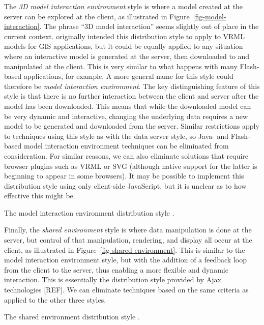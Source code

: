 \documentclass[acmtocl,acmnow]{acmtrans2m}
\begin{document}
The \emph{3D model interaction environment} style is where a model
created at the server can be explored at the client, as illustrated in
Figure~\ref{fig-model-interaction}. The phrase ``3D model interaction''
seems slightly out of place in the current context.
 originally intended this distribution style to
apply to VRML models for GIS applications, but it could be equally
applied to any situation where an interactive model is generated at the
server, then downloaded to and manipulated at the client. This is very
similar to what happens with many Flash-based applications, for example.
A more general name for this style could therefore be \emph{model
interaction environment}. The key distinguishing feature of this style
is that there is no further interaction between the client and server
after the model has been downloaded. This means that while the
downloaded model can be very dynamic and interactive, changing the
underlying data requires a new model to be generated and downloaded from
the server. Similar restrictions apply to techniques using this style as
with the data server style, so Java- and Flash-based model interaction
environment techniques can be eliminated from consideration. For similar
reasons, we can also eliminate solutions that require browser plugins
such as VRML or SVG (although native support for the latter is beginning
to appear in some browsers). It may be possible to implement this
distribution style using only client-side JavaScript, but it is unclear
as to how effective this might be.


\begin{narrowfig}{2cm}
	\caption{The model interaction environment distribution style
	\protect\cite{Wood-J-1996-vis}.}
	\label{fig-model-interaction}
\end{narrowfig}


Finally, the \emph{shared environment} style is where data manipulation
is done at the server, but control of that manipulation, rendering, and
display all occur at the client, as illustrated in
Figure~\ref{fig-shared-environment}. This is similar to the model
interaction environment style, but with the addition of a feedback loop
from the client to the server, thus enabling a more flexible and dynamic
interaction. This is essentially the distribution style provided by Ajax
technologies [REF]. We can eliminate techniques based on the same criteria
as applied to the other three styles.


\begin{narrowfig}{2cm}
	\caption{The shared environment distribution style
	\protect\cite{Wood-J-1996-vis}.}
	\label{fig-shared-environment}
\end{narrowfig}
\end{document}
